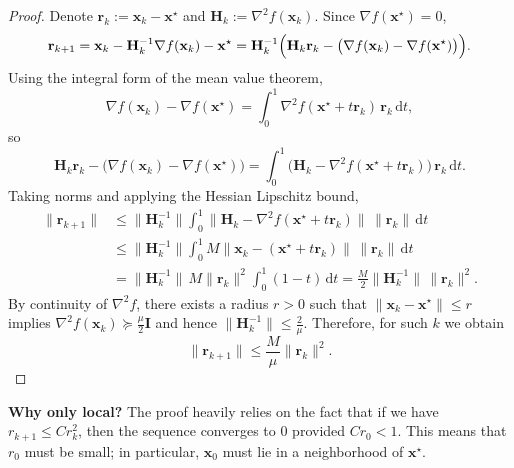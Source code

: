 \begin{proof}
Denote $\mathbf{r}_k:=\mathbf{x}_k-\mathbf{x}^\star$ and
$\mathbf{H}_k:=\nabla^2 f(\mathbf{x}_k)$. Since $\nabla f(\mathbf{x}^\star)=0$,
\[
  \mathbf{r}_{k+1}
  =\mathbf{x}_k-\mathbf{H}_k^{-1}\nabla f(\mathbf{x}_k)-\mathbf{x}^\star
  =\mathbf{H}_k^{-1}\Bigl(\mathbf{H}_k\mathbf{r}_k-\bigl(\nabla f(\mathbf{x}_k)-\nabla f(\mathbf{x}^\star)\bigr)\Bigr).
\]
Using the integral form of the mean value theorem,
\[
  \nabla f(\mathbf{x}_k)-\nabla f(\mathbf{x}^\star)
  =\int_0^1 \nabla^2 f(\mathbf{x}^\star+t\mathbf{r}_k)\,\mathbf{r}_k\,\mathrm{d}t,
\]
so
\[
  \mathbf{H}_k\mathbf{r}_k-\bigl(\nabla f(\mathbf{x}_k)-\nabla f(\mathbf{x}^\star)\bigr)
  =\int_0^1 \bigl(\mathbf{H}_k-\nabla^2 f(\mathbf{x}^\star+t\mathbf{r}_k)\bigr)\,\mathbf{r}_k\,\mathrm{d}t.
\]
Taking norms and applying the Hessian Lipschitz bound,
\begin{align*}
  \|\mathbf{r}_{k+1}\|
  &\le \|\mathbf{H}_k^{-1}\|\int_0^1
  \|\mathbf{H}_k-\nabla^2 f(\mathbf{x}^\star+t\mathbf{r}_k)\|\,\|\mathbf{r}_k\|\,\mathrm{d}t\\
  &\le \|\mathbf{H}_k^{-1}\|\int_0^1
  M\|\mathbf{x}_k-(\mathbf{x}^\star+t\mathbf{r}_k)\|\,\|\mathbf{r}_k\|\,\mathrm{d}t\\
  &= \|\mathbf{H}_k^{-1}\|\,M\|\mathbf{r}_k\|^2\int_0^1(1-t)\,\mathrm{d}t
  =\frac{M}{2}\|\mathbf{H}_k^{-1}\|\,\|\mathbf{r}_k\|^2.
\end{align*}
By continuity of $\nabla^2 f$, there exists a radius $r>0$ such that
$\|\mathbf{x}_k-\mathbf{x}^\star\|\le r$ implies
$\nabla^2 f(\mathbf{x}_k)\succeq \frac{\mu}{2}\mathbf{I}$ and hence
$\|\mathbf{H}_k^{-1}\|\le \frac{2}{\mu}$. Therefore, for such $k$ we obtain
\[
  \|\mathbf{r}_{k+1}\|\le \frac{M}{\mu}\|\mathbf{r}_k\|^2.
\]
\end{proof}

\noindent\textbf{Why only local?} The proof heavily relies on the fact that
if we have $r_{k+1} \le C r_k^2$, then the sequence converges to $0$ provided
$Cr_0 < 1$. This means that $r_0$ must be small; in particular, $\mathbf{x}_0$
must lie in a neighborhood of $\mathbf{x}^{\star}$.
